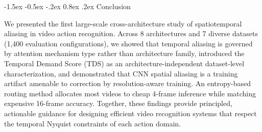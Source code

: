 \documentclass[runningheads]{llncs}
\makeatletter
\renewcommand\section{\@startsection{section}{1}{\z@}%
                       {-1.5ex \@plus -0.5ex \@minus -.2ex}%
                       {0.8ex \@plus .2ex}%
                       {\normalfont\large\bfseries\boldmath}}
\newcommand{\TDS}{\textsc{TDS}}
\makeatother
\begin{document}
\section{Conclusion}
\label{sec:conclusion}

We presented the first large-scale cross-architecture study of spatiotemporal aliasing
in video action recognition.
Across 8 architectures and 7 diverse datasets (1,400 evaluation configurations),
we showed that temporal aliasing is governed by attention mechanism type rather than
architecture family, introduced the Temporal Demand Score (\TDS{}) as an
architecture-independent dataset-level characterization, and demonstrated that CNN
spatial aliasing is a training artifact amenable to correction by resolution-aware
training.
An entropy-based routing method allocates most videos to cheap 4-frame inference
while matching expensive 16-frame accuracy.
Together, these findings provide principled, actionable guidance for designing
efficient video recognition systems that respect the temporal Nyquist constraints
of each action domain.



\end{document}
